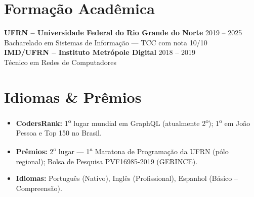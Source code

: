 \documentclass[11pt,a4paper]{article}
\begin{document}
\section{Forma\c{c}\~ao Acad\^emica}
\textbf{UFRN -- Universidade Federal do Rio Grande do Norte} \hfill 2019 -- 2025 \\
Bacharelado em Sistemas de Informa\c{c}\~ao --- TCC com nota 10/10 \\[6pt]
\textbf{IMD/UFRN -- Instituto Metr\'opole Digital} \hfill 2018 -- 2019 \\
T\'ecnico em Redes de Computadores

\section{Idiomas \& Pr\^emios}
\begin{itemize}[leftmargin=14pt, itemsep=2pt, topsep=0pt]
    \item \textbf{CodersRank:} 1\textsuperscript{o} lugar mundial em GraphQL (atualmente 2\textsuperscript{o}); 1\textsuperscript{o} em Jo\~ao Pessoa e Top 150 no Brasil.
    \item \textbf{Pr\^emios:} 2\textsuperscript{o} lugar --- 1\textsuperscript{a} Maratona de Programa\c{c}\~ao da UFRN (p\'olo regional); Bolsa de Pesquisa PVF16985-2019 (GERINCE).
    \item \textbf{Idiomas:} Portugu\^es (Nativo), Ingl\^es (Profissional), Espanhol (B\'asico -- Compreens\~ao).
\end{itemize}
\end{document}
